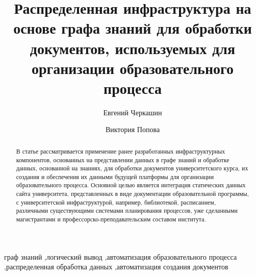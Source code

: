 \documentclass[ 

]{aiitart}
\newcommand{\email}[1]{\texttt{#1}}
\begin{document}
 


\title{Распределенная инфраструктура на основе графа знаний для обработки документов, используемых для организации образовательного процесса} 

\author[1,2]{Евгений Черкашин} \author[2]{Виктория Попова} 

\address[1]{Институт динамики систем и теории управления им. В.М. Матросова СО ран, Иркутск, Россия} \address[2]{Институт математики и информационных технологий, Иркутский государственный университет, Иркутск, Россия\\[0.7em] \email{eugeneai@icc.ru};\quad\email{victorypopova1@gmail.com}} 


\begin{abstract}
В статье рассматривается применение ранее разработанных инфраструктурных компонентов, основанных на представлении данных в графе знаний и обработке данных, основанной на знаниях, для обработки документов университетского курса, их создания и обеспечения их данными будущей платформы для организации образовательного процесса. Основной целью является интеграция статических данных сайта университета, представленных в виде документации образовательной программы, с университетской инфраструктурой, например, библиотекой, расписанием, различными существующими системами планирования процессов, уже сделанными магистрантами и профессорско-преподавательским составом института. 
\end{abstract} 

\begin{keywords}
граф знаний \sep логический вывод \sep автоматизация образовательного процесса \sep распределенная обработка данных \sep автоматизация создания документов 
\end{keywords} 
\end{document}
